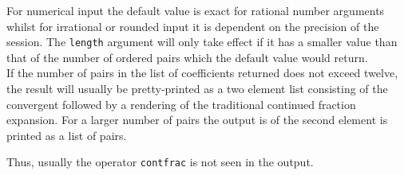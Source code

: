 For numerical input the default value is exact for
rational number arguments whilst for irrational or rounded input it is
dependent on the precision of the session. The
\texttt{length} argument will only take effect if it has a smaller
value than that of the number of ordered pairs which the default
value would return.\\[\baselineskip]

If the number of pairs in the list of coefficients returned does not exceed
twelve, the result will usually be pretty-printed as a two element list
consisting of the convergent followed by a rendering of the traditional
continued fraction expansion. For a larger number of pairs the output is
of the second element is printed as a list of pairs.

Thus, usually the operator \texttt{contfrac} is not seen in the output.


